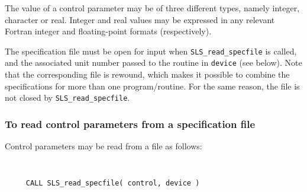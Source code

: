 \documentclass{galahad}
\newcommand{\packagename}{SLS}
\begin{document}
The value of a control parameter may be of three different types, namely
integer, character or real.
Integer and real values may be expressed in any relevant Fortran integer and
floating-point formats (respectively).

The specification file must be open for
input when {\tt \packagename\_read\_specfile}
is called, and the associated unit number
passed to the routine in {\tt device} (see below).
Note that the corresponding
file is rewound, which makes it possible to combine the specifications
for more than one program/routine.  For the same reason, the file is not
closed by {\tt \packagename\_read\_specfile}.

\subsubsection{To read control parameters from a specification file}
\label{readspec}

Control parameters may be read from a file as follows:
\hskip0.5in

\def\baselinestretch{0.8}
{\tt
\begin{verbatim}
     CALL SLS_read_specfile( control, device )
\end{verbatim}
}
\def\baselinestretch{1.0}
\end{document}
